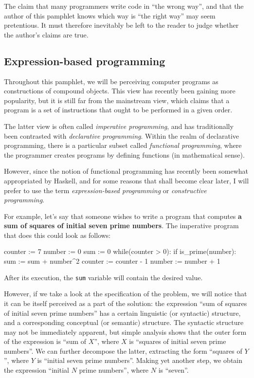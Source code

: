 The claim that many programmers write code in ``the wrong way'',
and that the author of this pamphlet knows which way is 
``the right way'' may seem pretentious. It must therefore
inevitably be left to the reader to judge whether the author's
claims are true.

\subsection{Expression-based programming}

Throughout this pamphlet, we will be perceiving computer programs
as constructions of compound objects. This view has recently been
gaining more popularity, but it is still far from the mainstream
view, which claims that a program is a set of instructions that
ought to be performed in a given order.

The latter view is often called \textit{imperative programming},
and has traditionally been contrasted with \textit{declarative
 programming}.
Within the realm of declarative programming, there is a particular
subset called \textit{functional programming}, where the programmer
creates programs by defining functions (in mathematical sense).

However, since the notion of functional programming has recently
been somewhat appropriated by Haskell, and for some reasons that
shall become clear later, I will prefer to use the term
\textit{expression-based programming} or \textit{constructive
programming}.

For example, let's say that someone wishes to write a program that
computes \textbf{a sum of squares of initial seven prime numbers}. 
The imperative program that does this could look as follows:

\begin{Snippet}

counter := 7
number := 0
sum := 0
while(counter > 0):
    if is_prime(number):
        sum := sum + number^2
        counter := counter - 1
    number := number + 1

\end{Snippet}

After its execution, the \texttt{sum} variable will contain the
desired value.

However, if we take a look at the specification of the problem,
we will notice that it can be itself perceived as a part of the
solution: the expression ``sum of squares of initial seven prime
 numbers'' has a certain linguistic (or syntactic) structure,
and a corresponding conceptual (or semantic) structure. The 
syntactic structure may not be immediately apparent, but simple
analysis shows that the outer form of the expression is 
``sum of $X$'', where $X$ is ``squares of initial seven prime
numbers''. We can further decompose the latter, extracting the 
form ``squares of $Y$'',  where $Y$ is ``initial seven prime 
numbers''. Making yet another step, we obtain the expression
``initial $N$ prime numbers'', where $N$ is ``seven''.

